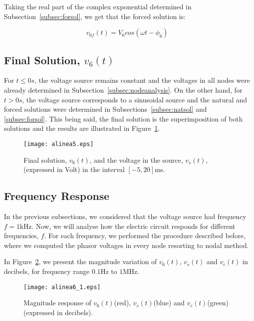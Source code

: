 Taking the real part of the complex exponential determined in Subsection~\ref{subsec:forsol}, we get that the forced solution is:

\begin{equation}
  v_{6f}(t) = V_6 cos(\omega t - \phi_6)
\end{equation}


\subsection{Final Solution, $v_6(t)$} \label{subsec:finsol}

For $t \leq 0s$, the voltage source remains constant and the voltages in all nodes were already determined in Subsection~\ref{subsec:nodeanalysis}. On the other hand, for $t>0s$, the voltage source corresponds to a sinusoidal source and the natural and forced solutions were determined in Subsections~\ref{subsec:natsol} and \ref{subsec:forsol}. This being said, the final solution is the superimposition of both solutions and the results are illustrated in Figure~\ref{fig:finsol}.

\begin{figure}[H] \centering
\texttt{[image: alinea5.eps]}
\caption{Final solution, $v_{6}(t)$, and the voltage in the source, $v_s(t)$, (expressed in Volt) in the interval $[-5,20]$ms.}
\label{fig:finsol}
\end{figure}


\subsection{Frequency Response}

In the previous subsections, we considered that the voltage source had frequency $f=1$kHz. Now, we will analyse how the electric circuit responds for different frequencies, $f$. For each frequency, we performed the procedure described before, where we computed the phasor voltages in every node resorting to nodal method.

In Figure~\ref{fig:magnitude}, we present the magnitude variation of $v_6(t)$, $v_s(t)$ and $v_c(t)$ in decibels, for frequency range $0.1$Hz to $1$MHz.

\begin{figure}[H] \centering
\texttt{[image: alinea6\_1.eps]}
\caption{Magnitude response of $v_6(t)$(red), $v_s(t)$(blue) and $v_c(t)$(green) (expressed in decibels).}
\label{fig:magnitude}
\end{figure}

